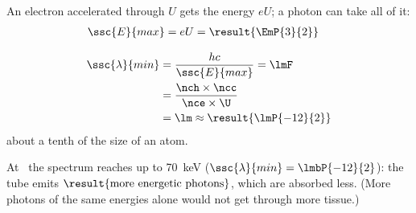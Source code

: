 \begin{abcliste}
\abc An electron accelerated through $U$ gets the energy $eU$; a photon can take all of it:
\begin{align}
 \ssc{E}{max} &= e U = \result{\EmP{3}{2}}
\end{align}

\abc
\begin{align}
 \ssc{\lambda}{min} &= \frac{h c}{\ssc{E}{max}} = \lmF \\
   &= \frac{\nch\times\ncc}{\nce\times\U} \\
   &= \lm \approx \result{\lmP{-12}{2}}
\end{align}
about a tenth of the size of an atom.

\abc At \UbO\ the spectrum reaches up to \SI{70}{\kilo\electronvolt} ($\ssc{\lambda}{min} = \lmbP{-12}{2}$): the tube emits $\result{\text{more energetic photons}}$, which are absorbed less. (More photons of the same energies alone would not get through more tissue.)
\end{abcliste}
